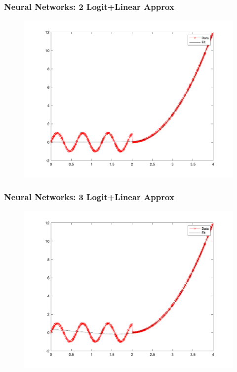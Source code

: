 \documentclass{beamer}
\begin{document}
\begin{frame}
\frametitle[alignment=center]{Neural Networks: 2 Logit+Linear Approx}
\begin{figure}
\includegraphics[scale=0.5]{NN_Example/Fig_Shallow_2.png}
\end{figure}
\end{frame}

\begin{frame}
\frametitle[alignment=center]{Neural Networks: 3 Logit+Linear Approx}
\begin{figure}
\includegraphics[scale=0.5]{NN_Example/Fig_Shallow_3.png}
\end{figure}
\end{frame}
\end{document}
